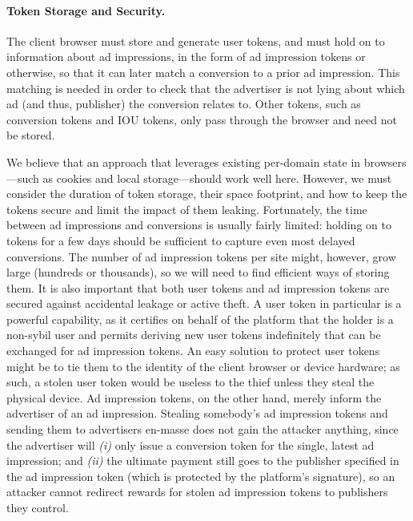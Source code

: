 \paragraph{Token Storage and Security.}
%
The client browser must store and generate user tokens, and must hold on to information about ad impressions, in the form of ad impression tokens or otherwise, so that it can later match a conversion to a prior ad impression.
%
This matching is needed in order to check that the advertiser is not lying about which ad (and thus, publisher) the conversion relates to.
%
Other tokens, such as conversion tokens and IOU tokens, only pass through the browser and need not be stored.
%

%
We believe that an approach that leverages existing per-domain state in browsers---such as cookies and local storage---should work well here.
%
However, we must consider the duration of token storage, their space footprint, and how to keep the tokens secure and limit the impact of them leaking.
%
Fortunately, the time between ad impressions and conversions is usually fairly limited: holding on to tokens for a few days should be sufficient to capture even most delayed conversions.
%
The number of ad impression tokens per site might, however, grow large (hundreds or thousands), so we will need to find efficient ways of storing them.
%
It is also important that both user tokens and ad impression tokens are secured against accidental leakage or active theft.
%
A user token in particular is a powerful capability, as it certifies on behalf of the platform that the holder is a non-sybil user and permits deriving new user tokens indefinitely that can be exchanged for ad impression tokens.
%
An easy solution to protect user tokens might be to tie them to the identity of the client browser or device hardware; as such, a stolen user token would be useless to the thief unless they steal the physical device.
%
Ad impression tokens, on the other hand, merely inform the advertiser of an ad impression.
%
Stealing somebody's ad impression tokens and sending them to advertisers en-masse does not gain the attacker anything, since the advertiser will \emph{(i)} only issue a conversion token for the single, latest ad impression; and \emph{(ii)} the ultimate payment still goes to the publisher specified in the ad impression token (which is protected by the platform's signature), so an attacker cannot redirect rewards for stolen ad impression tokens to publishers they control.
%


